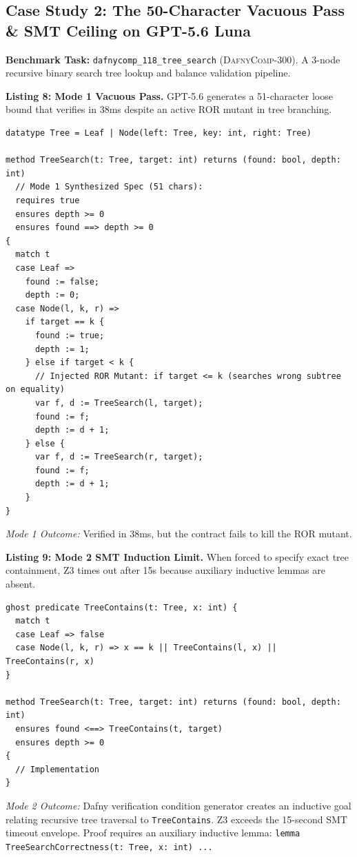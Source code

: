 \documentclass{article}
\begin{document}
\subsection{Case Study 2: The 50-Character Vacuous Pass \& SMT Ceiling on GPT-5.6 Luna}

\textbf{Benchmark Task:} \texttt{dafnycomp\_118\_tree\_search} (\textsc{DafnyComp-300}). A 3-node recursive binary search tree lookup and balance validation pipeline.

\vspace{0.3em}
\noindent\textbf{Listing 8: Mode 1 Vacuous Pass.} GPT-5.6 generates a 51-character loose bound that verifies in 38ms despite an active ROR mutant in tree branching.
{\footnotesize
\begin{verbatim}
datatype Tree = Leaf | Node(left: Tree, key: int, right: Tree)

method TreeSearch(t: Tree, target: int) returns (found: bool, depth: int)
  // Mode 1 Synthesized Spec (51 chars):
  requires true
  ensures depth >= 0
  ensures found ==> depth >= 0
{
  match t
  case Leaf =>
    found := false;
    depth := 0;
  case Node(l, k, r) =>
    if target == k {
      found := true;
      depth := 1;
    } else if target < k {
      // Injected ROR Mutant: if target <= k (searches wrong subtree on equality)
      var f, d := TreeSearch(l, target);
      found := f;
      depth := d + 1;
    } else {
      var f, d := TreeSearch(r, target);
      found := f;
      depth := d + 1;
    }
}
\end{verbatim}
}
\textit{Mode 1 Outcome:} Verified in 38ms, but the contract fails to kill the ROR mutant.

\vspace{0.3em}
\noindent\textbf{Listing 9: Mode 2 SMT Induction Limit.} When forced to specify exact tree containment, Z3 times out after 15s because auxiliary inductive lemmas are absent.
{\footnotesize
\begin{verbatim}
ghost predicate TreeContains(t: Tree, x: int) {
  match t
  case Leaf => false
  case Node(l, k, r) => x == k || TreeContains(l, x) || TreeContains(r, x)
}

method TreeSearch(t: Tree, target: int) returns (found: bool, depth: int)
  ensures found <==> TreeContains(t, target)
  ensures depth >= 0
{
  // Implementation
}
\end{verbatim}
}
\textit{Mode 2 Outcome:} Dafny verification condition generator creates an inductive goal relating recursive tree traversal to \texttt{TreeContains}. Z3 exceeds the 15-second SMT timeout envelope. Proof requires an auxiliary inductive lemma:
\texttt{lemma TreeSearchCorrectness(t: Tree, x: int) ...}
\end{document}
